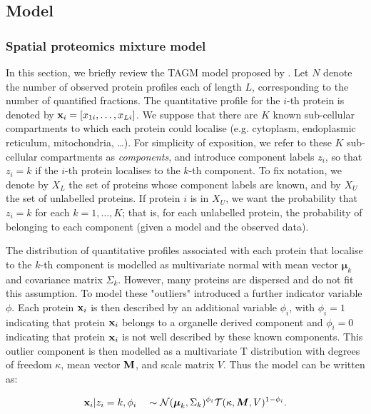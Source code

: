 \documentclass[12pt,english]{article}
\begin{document}
\subsection{Model}
\subsubsection{Spatial proteomics mixture model}
In this section, we briefly review the TAGM model proposed by \citep{Crook:2018}. Let $N$ denote the number of observed protein profiles each of length $L$, corresponding to
the number of quantified fractions. The quantitative profile for the $i$-th protein is denoted by ${\bf x}_i = [x_{1i}, \ldots, x_{Li}]$.  We suppose that there are $K$
known sub-cellular compartments to which each protein could localise
(e.g. cytoplasm, endoplasmic reticulum, mitochondria, \ldots). For simplicity of exposition, we refer to these $K$ sub-cellular compartments as {\em
	components}, and introduce component labels $z_i$, so that $z_i = k$
if the $i$-th protein localises to the $k$-th component. To fix notation, we denote by
$X_L$ the set of proteins whose component labels are known, and by
$X_U$ the set of unlabelled proteins.  If protein $i$ is in $X_U$, we
want the probability that $z_i = k$ for each $k = 1, \ldots, K$;
that is, for each unlabelled protein, the probability of
belonging to each component (given a model and the observed data).


The distribution of quantitative profiles associated with each
protein that localise to the $k$-th component is modelled as multivariate normal
with mean vector $\boldsymbol{\mu}_k$ and covariance matrix
$\Sigma_k$. However, many proteins are dispersed and do not fit this assumption. To model these "outliers" \cite{Crook:2018} introduced a further indicator variable $\phi$. Each protein ${\bf x}_i$ is then described by an additional variable $\phi_i$, with $\phi_i = 1$ indicating that protein ${\bf x}_i$ belongs to a
organelle derived component and $\phi_i = 0$ indicating that protein
${\bf x}_i$ is not well described by these known components. This
outlier component is then modelled as a multivariate T distribution with
degrees of freedom $\kappa$, mean vector $\bf{M}$, and scale matrix
$V$. Thus the model can be written as:

\begin{align}
{\bf x}_i | z_i = k, \phi_i \quad \sim \mathcal{N}(\boldsymbol{\mu}_k, \Sigma_k)^{\phi_i}\mathcal{T}(\kappa, \boldsymbol{M}, V)^{1 - \phi_i }.
\end{align}
\end{document}
